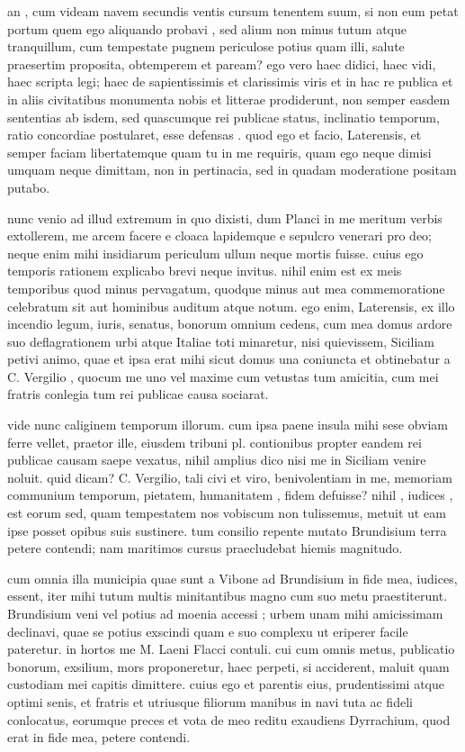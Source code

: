  an , cum videam navem secundis ventis cursum tenentem suum, si non eum petat portum quem ego aliquando probavi , sed alium non minus tutum atque tranquillum, cum tempestate pugnem periculose potius quam illi, salute praesertim proposita, obtemperem et paream? ego vero haec didici, haec vidi, haec scripta legi; haec de sapientissimis et clarissimis viris et in hac re publica et in aliis civitatibus monumenta nobis et litterae prodiderunt, non semper easdem sententias ab isdem, sed quascumque rei publicae status, inclinatio temporum, ratio concordiae postularet, esse defensas . quod ego et facio, Laterensis, et semper faciam libertatemque quam tu in me requiris, quam ego neque dimisi umquam neque dimittam, non in pertinacia, sed in quadam moderatione positam putabo.

 nunc venio ad illud extremum in quo dixisti, dum Planci in me meritum verbis extollerem, me arcem facere e cloaca lapidemque e sepulcro venerari pro deo; neque enim mihi insidiarum periculum ullum neque mortis fuisse. cuius ego temporis rationem explicabo brevi neque invitus. nihil enim est ex meis temporibus quod minus pervagatum, quodque minus aut mea commemoratione celebratum sit aut hominibus auditum atque notum. ego enim, Laterensis, ex illo incendio legum, iuris, senatus, bonorum omnium cedens, cum mea domus ardore suo deflagrationem urbi atque Italiae toti minaretur, nisi quievissem, Siciliam petivi animo, quae et ipsa erat mihi sicut domus una coniuncta et obtinebatur a C. Vergilio , quocum me uno vel maxime cum vetustas tum amicitia, cum mei fratris conlegia tum rei publicae causa sociarat.

 vide nunc caliginem temporum illorum. cum ipsa paene insula mihi sese obviam ferre vellet, praetor ille, eiusdem tribuni pl. contionibus propter eandem rei publicae causam saepe vexatus, nihil amplius dico nisi me in Siciliam venire noluit. quid dicam? C. Vergilio, tali civi et viro, benivolentiam in me, memoriam communium temporum, pietatem, humanitatem , fidem defuisse? nihil , iudices , est eorum sed, quam tempestatem nos vobiscum non tulissemus, metuit ut eam ipse posset opibus suis sustinere. tum consilio repente mutato Brundisium terra petere contendi; nam maritimos cursus praecludebat hiemis magnitudo.

 cum omnia illa municipia quae sunt a Vibone ad Brundisium in fide mea, iudices, essent, iter mihi tutum multis minitantibus magno cum suo metu praestiterunt. Brundisium veni vel potius ad moenia accessi ; urbem unam mihi amicissimam declinavi, quae se potius exscindi quam e suo complexu ut eriperer facile pateretur. in hortos me M. Laeni Flacci contuli. cui cum omnis metus, publicatio bonorum, exsilium, mors proponeretur, haec perpeti, si acciderent, maluit quam custodiam mei capitis dimittere. cuius ego et parentis eius, prudentissimi atque optimi senis, et fratris et utriusque filiorum manibus in navi tuta ac fideli conlocatus, eorumque preces et vota de meo reditu exaudiens Dyrrachium, quod erat in fide mea, petere contendi.

